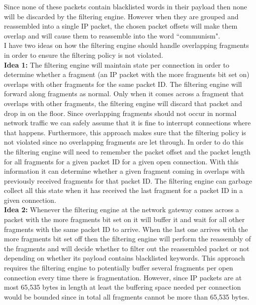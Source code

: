 Since none of these packets contain blacklisted words in their payload then none will be discarded by the filtering engine. However when they are grouped and reassembled into a single IP packet, the chosen packet offsets will make them overlap and will cause them to reassemble into the word ``communism".\\

I have two ideas on how the filtering engine should handle overlapping fragments in order to ensure the filtering policy is not violated. \\

\textbf{Idea 1: } The filtering engine will maintain state per connection in order to determine whether a fragment (an IP packet with the more fragments bit set on) overlaps with other fragments for the same packet ID. The filtering engine will forward along fragments as normal. Only when it comes across a fragment that overlaps with other fragments, the filtering engine will discard that packet and drop in on the floor. Since overlapping fragments should not occur in normal network traffic we can safely assume that it is fine to interrupt connections where that happens. Furthermore, this approach makes sure that the filtering policy is not violated since no overlapping fragments are let through. In order to do this the filtering engine will need to remember the packet offset and the packet length for all fragments for a given packet ID for a given open connection. With this information it can determine whether a given fragment coming in overlaps with previously received fragments for that packet ID. The filtering engine can garbage collect all this state when it has received the last fragment for a packet ID in a given connection.\\

\textbf{Idea 2: } Whenever the filtering engine at the network gateway comes across a packet with the more fragments bit set on it will buffer it and wait for all other fragments with the same packet ID to arrive. When the last one arrives with the more fragments bit set off then the filtering engine will perform the reassembly of the fragments and will decide whether to filter out the reassembled packet or not depending on whether its payload contains blacklisted keywords. This approach requires the filtering engine to potentially buffer several fragments per open connection every time there is fragmentation. However, since IP packets are at most 65,535 bytes in length at least the buffering space needed per connection would be bounded since in total all fragments cannot be more than 65,535 bytes.